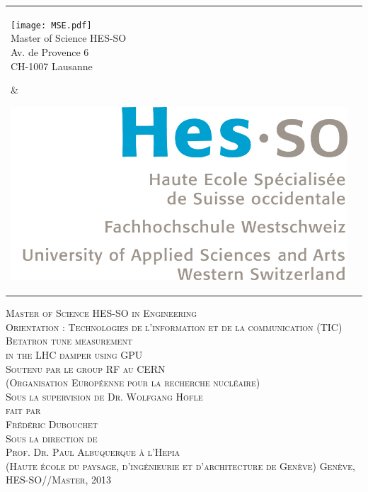 
\begin{titlepage}

\begin{flushleft}
\begin{tabular}{lr}
    \parbox{8.5cm}{
    	\texttt{[image: MSE.pdf]}\\
    	\small Master of Science HES-SO\\
		\small Av. de Provence 6\\
		\small CH-1007 Lausanne
	} &
    \parbox{4cm}{
    	\includegraphics[scale=0.1]{HESSO.jpg}
    } \\[3cm]
\end{tabular}
\end{flushleft}

\begin{flushright}
\textsc{\Large Master of Science HES-SO in Engineering} \\[0.2cm]
\textsc{\small Orientation : Technologies de l'information et de la communication (TIC)}\\[1cm]
\textsc{\LARGE Betatron tune measurement \\[0.3cm] in the LHC damper using GPU} \\ [1cm]
\textsc{\small Soutenu par le group RF au CERN}\\ 
\textsc{\small (Organisation Europ{\'e}enne pour la recherche nucl{\'e}aire)}\\
\textsc{\small Sous la supervision de Dr. Wolfgang H{\"o}f\/le} \\[2cm]
\textsc{\small fait par} \\
\textsc{\Large Fr{\'e}d{\'e}ric Dubouchet} \\[2cm]
\textsc{\small Sous la direction de}\\
\textsc{\small Prof. Dr. Paul Albuquerque}
\textsc{\small {\`a} l'Hepia}\\
\textsc{\small (Haute {\'e}cole du paysage, d'ing{\'e}nieurie et d'architecture de Gen{\`e}ve)}
\vfill %
\textsc{\small Gen{\`e}ve, HES-SO//Master, 2013}
\end{flushright}

\end{titlepage}

